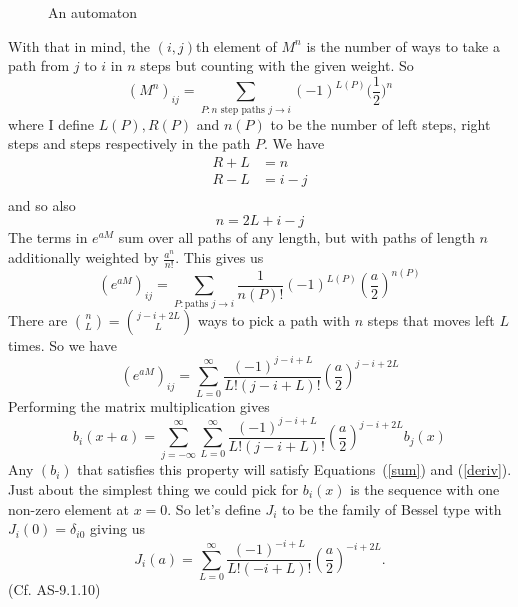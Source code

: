 \documentclass{article}
\begin{document}
\begin{figure}
\centering
{}
\caption{An automaton}
\label{automaton}
\end{figure}
With that in mind, the $(i,j)$th element of $M^n$ is the number of ways to take a path from $j$ to $i$ in $n$ steps but counting with the given weight.
So
\[
(M^n)_{ij} = \sum_{P:\mbox{$n$ step paths $j\rightarrow i$}} (-1)^{L(P)}\Big(\frac{1}{2}\Big)^n
\]
where I define $L(P), R(P)$ and $n(P)$ to be the number of left steps, right steps and steps respectively in the path $P$.
We have
\begin{align*}
R+L &= n \\
R-L &= i-j \\
\end{align*}
and so also
\[
n = 2L+i-j 
\]
The terms in $e^{aM}$ sum over all paths of any length, but with paths of length $n$ additionally weighted by $\frac{a^n}{n!}$.
This gives us
\[
(e^{aM})_{ij} = \sum_{P:\mbox{paths }j\rightarrow i} \frac{1}{n(P)!}(-1)^{L(P)} (\frac{a}{2})^{n(P)}
\]
There are $\binom{n}{L}=\binom{j-i+2L}{L}$ ways to pick a path with $n$ steps that moves left $L$ times.
So we have
\[
(e^{aM})_{ij} = \sum_{L=0}^\infty\frac{(-1)^{j-i+L}}{L!(j-i+L)!}(\frac{a}{2})^{j-i+2L}
\]
Performing the matrix multiplication gives
\[
b_i(x+a) = \sum_{j=-\infty}^\infty\sum_{L=0}^\infty\frac{(-1)^{j-i+L}}{L!(j-i+L)!}(\frac{a}{2})^{j-i+2L} b_j(x)
\]
Any $(b_i)$ that satisfies this property will satisfy Equations~(\ref{sum}) and (\ref{deriv}).
Just about the simplest thing we could pick for $b_i(x)$ is the sequence with one non-zero element at $x=0$.
So let's define $J_i$ to be the family of Bessel type with $J_i(0)=\delta_{i0}$ giving us
\[
J_i(a) = \sum_{L=0}^\infty\frac{(-1)^{-i+L}}{L!(-i+L)!}(\frac{a}{2})^{-i+2L}.
\]
(Cf. AS-9.1.10)
\end{document}
